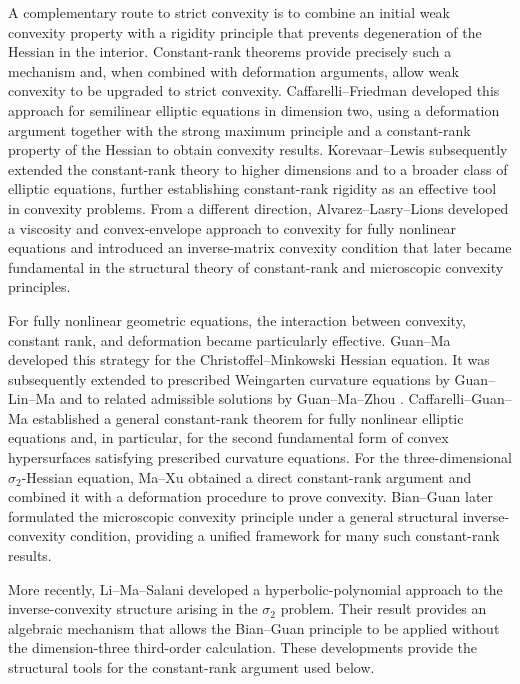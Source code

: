 \documentclass{article}
\numberwithin{equation}{section}
\begin{document}
A complementary route to strict convexity is to combine an initial
weak convexity property with a rigidity principle that prevents
degeneration of the Hessian in the interior. Constant-rank theorems
provide precisely such a mechanism and, when combined with deformation
arguments, allow weak convexity to be upgraded to strict convexity.
Caffarelli--Friedman \cite{CF85} developed this approach for semilinear
elliptic equations in dimension two, using a deformation argument
together with the strong maximum principle and a constant-rank property
of the Hessian to obtain convexity results. Korevaar--Lewis \cite{KL87}
subsequently extended the constant-rank theory to higher dimensions and
to a broader class of elliptic equations, further establishing
constant-rank rigidity as an effective tool in convexity problems.
From a different direction, Alvarez--Lasry--Lions \cite{ALL97}
developed a viscosity and convex-envelope approach to convexity for
fully nonlinear equations and introduced an inverse-matrix convexity
condition that later became fundamental in the structural theory of
constant-rank and microscopic convexity principles.

For fully nonlinear geometric equations, the interaction between
convexity, constant rank, and deformation became particularly
effective. Guan--Ma \cite{GM03} developed this strategy for the
Christoffel--Minkowski Hessian equation. It was subsequently extended
to prescribed Weingarten curvature equations by Guan--Lin--Ma
\cite{GLM06} and to related admissible solutions by Guan--Ma--Zhou
\cite{GMZ06}. Caffarelli--Guan--Ma \cite{CGM07} established a general
constant-rank theorem for fully nonlinear elliptic equations and, in
particular, for the second fundamental form of convex hypersurfaces
satisfying prescribed curvature equations. For the three-dimensional
$\sigma_2$-Hessian equation, Ma--Xu \cite{MX08} obtained a direct
constant-rank argument and combined it with a deformation procedure to
prove convexity. Bian--Guan \cite{BG09,BG10} later formulated the
microscopic convexity principle under a general structural
inverse-convexity condition, providing a unified framework for many
such constant-rank results.

More recently, Li–Ma–Salani \cite{LMS26} developed a
hyperbolic-polynomial approach to the inverse-convexity structure
arising in the $\sigma_2$ problem. Their result provides an
algebraic mechanism that allows the Bian–Guan principle to be applied
without the dimension-three third-order calculation.  These developments provide the
structural tools for the constant-rank argument used
below.
\end{document}
